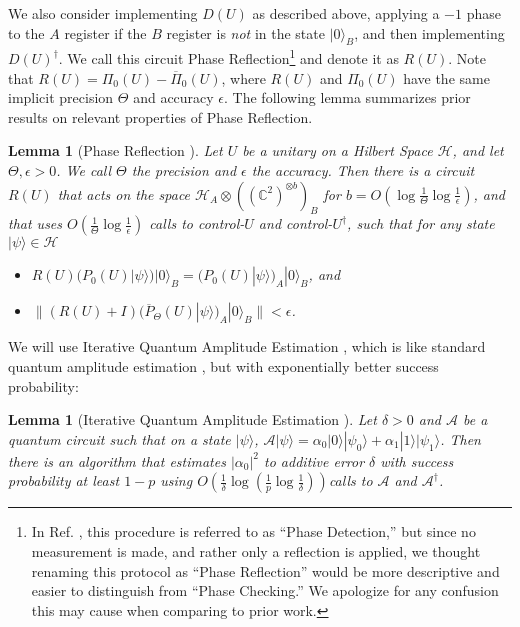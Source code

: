 \documentclass[cleveref, autoref, thm-restate,11pt]{article}
\newtheorem{lemma}[theorem]{Lemma}
\theoremstyle{definition}
\newcommand{\sop}[1]{{\mathcal #1}}
\newcommand{\ket}[1]{|#1\rangle}
\begin{document}
We also consider implementing $D(U)$ as
described above, applying a $-1$ phase to the $A$ register if the $B$
register is \textit{not} in the state $\ket{0}_B$, and then implementing $D
(U)^\dagger$. We call this circuit Phase Reflection\footnote{In Ref.
\cite{leeQuantumQueryComplexity2011}, this procedure is referred to as ``Phase
Detection,'' but since no measurement is made, and rather only a reflection is
applied, we thought renaming this protocol as ``Phase Reflection''
would be more descriptive and easier to distinguish from ``Phase Checking.'' We apologize for any confusion this may cause when
comparing to prior work.}
and denote it as $R(U).$ Note that $R(U)=\Pi_0(U)-\overline{\Pi}_0(U)$, where $R(U)$ and 
$\Pi_0(U)$ have the same implicit precision $\Theta$ and accuracy $\epsilon$. The following 
lemma summarizes prior results on relevant properties of Phase Reflection.
\begin{lemma} [Phase Reflection \cite{magniezSearchQuantumWalk2011,leeQuantumQueryComplexity2011}]
Let $U$ be a unitary on a Hilbert Space $\sop H$, and let
$\Theta,\epsilon>0$. We call $\Theta$ the precision and $\epsilon$ the accuracy. Then there is a circuit $R(U)$ that acts on the space
$\sop H_A\otimes ((\mathbb{C}^{2})^{\otimes b})_B$ for
$b=O\left(\log\frac{1}{\Theta}\log\frac{1}{\epsilon}\right)$, and that uses
$O\left(\frac{1}{\Theta}\log\frac{1}{\epsilon}\right)$ calls to control-$U$
and control-$U^\dagger$, such that for any state $\ket{\psi}\in \sop H$
\begin{itemize}
\item $R(U)(P_0(U)\ket{\psi})\ket{0}_B=(P_0(U)\ket{\psi})_A\ket{0}_B$, and
\item $\|(R(U)+I)(\overline{P}_\Theta(U)\ket{\psi})_A\ket{0}_B\|<\epsilon $.
\end{itemize}
\label{lem:phase_refl}
\end{lemma}




We will use Iterative Quantum Amplitude Estimation \cite{Grinko2021}, which is like standard quantum amplitude estimation \cite{brassardQuantumAmplitudeAmplification2000}, but with exponentially
better success probability:

\begin{lemma} [Iterative Quantum Amplitude Estimation \cite{Grinko2021}] Let
$\delta>0$ and $\mathcal{A}$ be a quantum circuit such that on a state $\ket{\psi}$, 
$\mathcal{A}\ket{\psi}=\alpha_0\ket{0}\ket{\psi_0}+\alpha_1\ket{1}\ket{\psi_1}$. 
Then there is an algorithm that estimates $|\alpha_0|^2$
 to additive error $\delta$ with success probability at least $1-p$ using 
$O\left(\frac{1}{\delta}\log\left(\frac{1}{p}\log\frac{1}{\delta}\right)\right)$calls to $\mathcal{A}$ and $\mathcal{A}^\dagger$.
\label{lem:ampEst}
\end{lemma}
\end{document}
